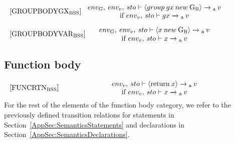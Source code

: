 \begin{equation}
\begin{minipage}{.2\linewidth}
$[\text{GROUPBODYGX}_\text{BSS}]$
\end{minipage}
\\
\begin{minipage}{.8\linewidth}
\centering
$env_G, \: env_v, \: sto \vdash \langle group \: gx \: new \: \text{G\textsubscript{B}} \rangle \xrightarrow{}\textsubscript{a} \: v $
\\if $env_v, \: sto \vdash gx \xrightarrow{} \textsubscript{a} \: v$
\end{minipage}
\end{equation}

\begin{equation}
\begin{minipage}{.2\linewidth}
$[\text{GROUPBODYVAR}_\text{BSS}]$
\end{minipage}
\\
\begin{minipage}{.8\linewidth}
\centering
$env_G, \: env_v, \: sto \vdash \langle x \: new \: \text{G\textsubscript{B}} \rangle \xrightarrow{}\textsubscript{a} \: v $
\\if $env_v, \: sto \vdash x \xrightarrow{} \textsubscript{a} \: v$
\end{minipage}
\end{equation}

\subsection{Function body}
\begin{equation}
\begin{minipage}{.2\linewidth}
$[\text{FUNCRTN}_\text{BSS}]$
\end{minipage}
\\
\begin{minipage}{.8\linewidth}
\centering
$env_v, \: sto \vdash \langle \text{return} \: x \rangle \xrightarrow{}\textsubscript{a} \: v $
\\
if $env_v, \: sto \vdash x \xrightarrow{} \textsubscript{a} \: v$
\end{minipage}
\end{equation}
For the rest of the elements of the function body category, we refer to the previously defined transition relations for statements in Section~\ref{AppSec:SemanticsStatements} and declarations in Section~\ref{AppSec:SemanticsDeclarations}.

